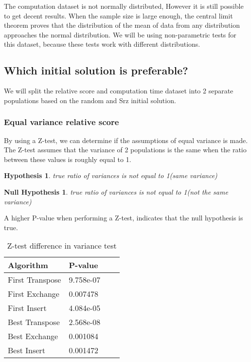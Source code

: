 \documentclass[]{article}
\newtheorem{hypothesis}{Hypothesis}
\newtheorem{nullhypothesis}{Null Hypothesis}
\begin{document}
	The computation dataset is not normally distributed, However
	it is still possible to get decent results.\newline
	When the sample size is large enough, the central limit theorem proves that the distribution of the mean of data from any distribution approaches the normal distribution.\newline
	We will be using non-parametric tests for this dataset, because these tests work with different distributions.
	
	
	
	
	
	\subsection{Which initial solution is preferable?}
	We will split the relative score and computation time dataset into 2 separate populations based on the random and Srz initial solution.
	\subsubsection{Equal variance relative score}
	By using a Z-test, we can determine if the assumptions of equal variance is made.
	The Z-test assumes that the variance of 2 populations is the same when the ratio between these values is roughly equal to 1.
	
	\begin{hypothesis}true ratio of variances is not equal to 1(same variance)\end{hypothesis}
	\begin{nullhypothesis}true ratio of variances is not equal to 1(not the same variance)\end{nullhypothesis}
	
	A higher P-value when performing a Z-test, indicates that the null hypothesis is true.
	
	\begin{table}[H]
		\centering
		\caption{Z-test difference in variance test}
		\label{tab:table1}
		\begin{tabular}{l{|}lll}
			\toprule
			Algorithm & P-value\\
			\midrule
			First Transpose & \color{OliveGreen} 9.758e-07\\ 
			First Exchange  &\color{OliveGreen}0.007478\\ 
			First Insert 	&\color{OliveGreen}4.084e-05\\ 
			Best Transpose &\color{OliveGreen}2.568e-08\\ 
			Best Exchange  &\color{OliveGreen}0.001084\\ 
			Best Insert 	&\color{OliveGreen}0.001472\\	
			\bottomrule
		\end{tabular}
	\end{table}
	
\end{document}
